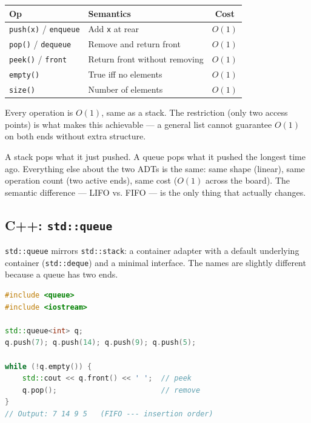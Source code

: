\documentclass[11pt]{article}
\begin{document}
\begin{center}
\begin{tabular}{|l|l|c|}
\hline
\textbf{Op} & \textbf{Semantics} & \textbf{Cost} \\
\hline
\texttt{push(x)} / \texttt{enqueue} & Add \texttt{x} at rear & $O(1)$ \\
\texttt{pop()}   / \texttt{dequeue} & Remove and return front & $O(1)$ \\
\texttt{peek()}  / \texttt{front}   & Return front without removing & $O(1)$ \\
\texttt{empty()} & True iff no elements & $O(1)$ \\
\texttt{size()}  & Number of elements   & $O(1)$ \\
\hline
\end{tabular}
\end{center}

Every operation is $O(1)$, same as a stack. The restriction
(only two access points) is what makes this achievable --- a
general list cannot guarantee $O(1)$ on both ends without extra
structure.

\begin{ideabox}
A stack pops what it just pushed. A queue pops what it pushed
the longest time ago. Everything else about the two ADTs is the
same: same shape (linear), same operation count (two active
ends), same cost ($O(1)$ across the board). The semantic
difference --- LIFO vs. FIFO --- is the only thing that actually
changes.
\end{ideabox}

\subsection*{C++: \texttt{std::queue}}

\texttt{std::queue} mirrors \texttt{std::stack}: a container
adapter with a default underlying container (\texttt{std::deque})
and a minimal interface. The names are slightly different because
a queue has two ends.

\begin{examplebox}
\begin{lstlisting}[language=C++,basicstyle=\ttfamily\small,frame=single]
#include <queue>
#include <iostream>

std::queue<int> q;
q.push(7); q.push(14); q.push(9); q.push(5);

while (!q.empty()) {
    std::cout << q.front() << ' ';  // peek
    q.pop();                        // remove
}
// Output: 7 14 9 5   (FIFO --- insertion order)
\end{lstlisting}
\end{examplebox}
\end{document}
